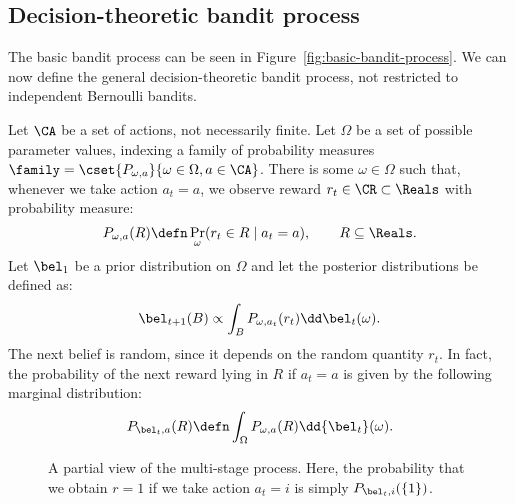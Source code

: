 \subsection{Decision-theoretic bandit process}
\label{sec:decision-theoretic-bandits}

The basic bandit process can be seen in Figure~\ref{fig:basic-bandit-process}. We can now define the general decision-theoretic bandit process, not restricted to independent Bernoulli bandits.
\begin{definition}
  Let $\CA$ be a set of actions, not necessarily finite. Let $\Omega$ be a set of possible parameter values, indexing a family of probability measures $\family = \cset{P_{\omega, a}}{\omega \in \Omega, a \in \CA}$. There is some $\omega \in \Omega$ such that, whenever we take action $a_t = a$, we observe reward $r_t \in \CR \subset \Reals$ with probability measure:
  \begin{equation}
    \label{eq:bandit-reward-probability}
    P_{\omega,a}(R) \defn \Pr_\omega(r_{t} \in R \mid a_t = a),
    \qquad R \subseteq \Reals.
  \end{equation}
  Let $\bel_1$ be a prior distribution on $\Omega$ and let the posterior distributions be defined as:
  \begin{equation}
    \label{eq:bandit-posteriors}
    \bel_{t+1}(B) \propto \int_B P_{\omega, a_t} (r_t) \dd \bel_t(\omega).
  \end{equation}
  The next belief is random, since it depends on the random quantity $r_t$. In fact, the probability of the next reward lying in $R$ if $a_t = a$ is given by the following marginal distribution:
  \begin{equation}
    \label{eq:dt-bandit-reward-probability}
    P_{\bel_t, a} (R) \defn \int_\Omega P_{\omega,a}(R) \dd{\bel_t}(\omega).
  \end{equation}
  \begin{figure}[ht]
    \begin{center}
    \end{center}
    \caption{A partial view of the multi-stage process. Here, the probability that we obtain $r=1$ if we take action $a_t = i$ is simply $P_{\bel_t,i}(\{1\})$.}
    \label{fig:multi-stage-bandit}
  \end{figure}  


\end{definition}
